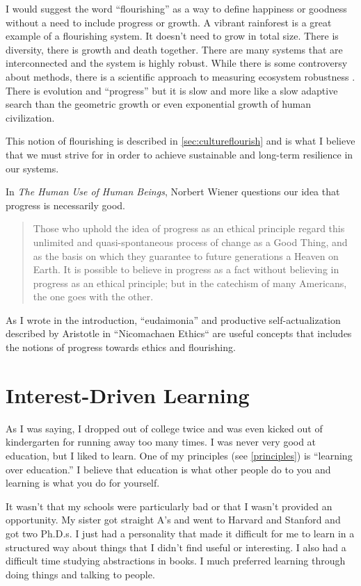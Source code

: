 I would suggest the word ``flourishing'' as a way to define happiness or goodness without a need to include progress or growth. A vibrant rainforest is a great example of a flourishing system. It doesn't need to grow in total size. There is diversity, there is growth and death together. There are many systems that are interconnected and the system is highly robust. While there is some controversy about methods, there is a scientific approach to measuring ecosystem robustness \cite{mumby2014ecological}. There is evolution and ``progress'' but it is slow and more like a slow adaptive search than the geometric growth or even exponential growth of human civilization.

This notion of flourishing is described in \autoref{sec:cultureflourish} and is what I believe that we must strive for in order to achieve sustainable and long-term resilience in our systems.

In \emph{The Human Use of Human Beings}, Norbert Wiener questions our idea that progress is necessarily good.

\begin{quotation}Those who uphold the idea of progress as an ethical principle regard this unlimited and quasi-spontaneous process of change as a Good Thing, and as the basis on which they guarantee to future generations a Heaven on Earth. It is possible to believe in progress as a fact without believing in progress as an ethical principle; but in the catechism of many Americans, the one goes with the other.\end{quotation}

As I wrote in the introduction, ``eudaimonia'' and productive self-actualization described by Aristotle in ``Nicomachaen Ethics`` \cite{rowe2002nicomachean} are useful concepts that includes the notions of progress towards ethics and flourishing.

\section{Interest-Driven Learning}

As I was saying, I dropped out of college twice and was even kicked out of kindergarten for running away too many times. I was never very good at education, but I liked to learn. One of my principles (see \autoref{principles}) is ``learning over education.'' I believe that education is what other people do to you and learning is what you do for yourself.

It wasn't that my schools were particularly bad or that I wasn't provided an opportunity. My sister got straight A's and went to Harvard and Stanford and got two Ph.D.s. I just had a personality that made it difficult for me to learn in a structured way about things that I didn't find useful or interesting. I also had a difficult time studying abstractions in books. I much preferred learning through doing things and talking to people.

